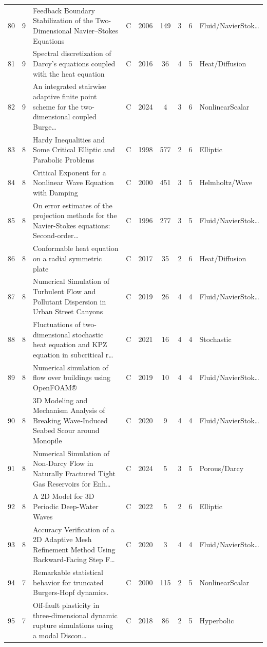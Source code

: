 \documentclass[10pt,letterpaper]{article}
\begin{document}
\begin{center}
\begin{longtable}{rrp{}cccccp{}}
80 & 9 & Feedback Boundary Stabilization of the Two-Dimensional Navier--Stokes Equations & C & 2006 & 149 & 3 & 6 & Fluid/NavierStok… \\
81 & 9 & Spectral discretization of Darcy's equations coupled with the heat equation & C & 2016 & 36 & 4 & 5 & Heat/Diffusion \\
82 & 9 & An integrated stairwise adaptive finite point scheme for the two-dimensional coupled Burge… & C & 2024 & 4 & 3 & 6 & NonlinearScalar \\
83 & 8 & Hardy Inequalities and Some Critical Elliptic and Parabolic Problems & C & 1998 & 577 & 2 & 6 & Elliptic \\
84 & 8 & Critical Exponent for a Nonlinear Wave Equation with Damping & C & 2000 & 451 & 3 & 5 & Helmholtz/Wave \\
85 & 8 & On error estimates of the projection methods for the Navier-Stokes equations: Second-order… & C & 1996 & 277 & 3 & 5 & Fluid/NavierStok… \\
86 & 8 & Conformable heat equation on a radial symmetric plate & C & 2017 & 35 & 2 & 6 & Heat/Diffusion \\
87 & 8 & Numerical Simulation of Turbulent Flow and Pollutant Dispersion in Urban Street Canyons & C & 2019 & 26 & 4 & 4 & Fluid/NavierStok… \\
88 & 8 & Fluctuations of two-dimensional stochastic heat equation and KPZ equation in subcritical r… & C & 2021 & 16 & 4 & 4 & Stochastic \\
89 & 8 & Numerical simulation of flow over buildings using OpenFOAM® & C & 2019 & 10 & 4 & 4 & Fluid/NavierStok… \\
90 & 8 & 3D Modeling and Mechanism Analysis of Breaking Wave-Induced Seabed Scour around Monopile & C & 2020 & 9 & 4 & 4 & Fluid/NavierStok… \\
91 & 8 & Numerical Simulation of Non-Darcy Flow in Naturally Fractured Tight Gas Reservoirs for Enh… & C & 2024 & 5 & 3 & 5 & Porous/Darcy \\
92 & 8 & A 2D Model for 3D Periodic Deep-Water Waves & C & 2022 & 5 & 2 & 6 & Elliptic \\
93 & 8 & Accuracy Verification of a 2D Adaptive Mesh Refinement Method Using Backward-Facing Step F… & C & 2020 & 3 & 4 & 4 & Fluid/NavierStok… \\
94 & 7 & Remarkable statistical behavior for truncated Burgers-Hopf dynamics. & C & 2000 & 115 & 2 & 5 & NonlinearScalar \\
95 & 7 & Off-fault plasticity in three-dimensional dynamic rupture simulations using a modal Discon… & C & 2018 & 86 & 2 & 5 & Hyperbolic \\

\end{longtable}
\end{center}
\end{document}
